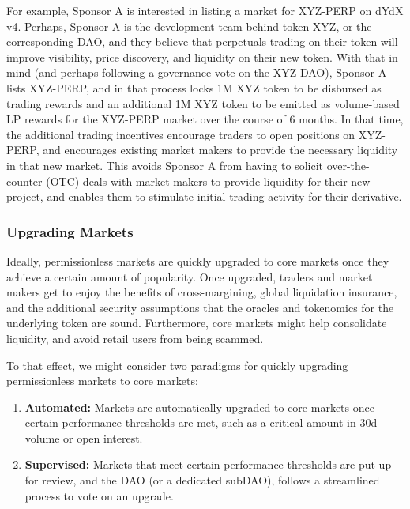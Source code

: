            For example, Sponsor A is interested in listing a market for XYZ-PERP on dYdX v4. Perhaps, Sponsor A is the development team behind token XYZ, or the corresponding DAO, and they believe that perpetuals trading on their token will improve visibility, price discovery, and liquidity on their new token. With that in mind (and perhaps following a governance vote on the XYZ DAO), Sponsor A lists XYZ-PERP, and in that process locks 1M XYZ token to be disbursed as trading rewards and an additional 1M XYZ token to be emitted as volume-based LP rewards for the XYZ-PERP market over the course of 6 months. In that time, the additional trading incentives encourage traders to open positions on XYZ-PERP, and encourages existing market makers to provide the necessary liquidity in that new market. This avoids Sponsor A from having to solicit over-the-counter (OTC) deals with market makers to provide liquidity for their new project, and enables them to stimulate initial trading activity for their derivative.
            
        \subsubsection{Upgrading Markets}

            Ideally, permissionless markets are quickly upgraded to core markets once they achieve a certain amount of popularity. Once upgraded, traders and market makers get to enjoy the benefits of cross-margining, global liquidation insurance, and the additional security assumptions that the oracles and tokenomics for the underlying token are sound. Furthermore, core markets might help consolidate liquidity, and avoid retail users from being scammed.

            To that effect, we might consider two paradigms for quickly upgrading permissionless markets to core markets:

            \begin{enumerate}
                \item \textbf{Automated:} Markets are automatically upgraded to core markets once certain performance thresholds are met, such as a critical amount in 30d volume or open interest.
                \item \textbf{Supervised:} Markets that meet certain performance thresholds are put up for review, and the DAO (or a dedicated subDAO), follows a streamlined process to vote on an upgrade.
            \end{enumerate}

